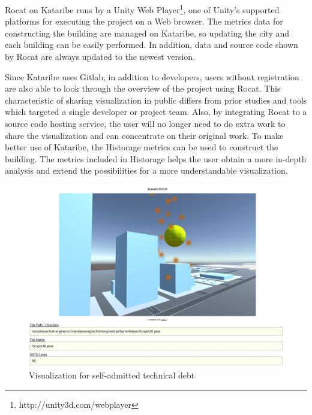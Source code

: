 \documentclass[conference]{IEEEtran}
\begin{document}
\textsf{Rocat} on \textsf{Kataribe} runs by a \textsf{Unity Web Player}\footnote{http://unity3d.com/webplayer}, one of \textsf{Unity}'s supported platforms for executing the project on a Web browser.
The metrics data for constructing the building are managed on \textsf{Kataribe}, so updating the city and each building can be easily performed.
In addition, data and source code shown by \textsf{Rocat} are always updated to the newest version.

Since \textsf{Kataribe} uses \textsf{Gitlab}, in addition to developers, users without registration are also able to look through the overview of the project using \textsf{Rocat}.
This characteristic of sharing visualization in public differs from prior studies and tools which targeted a single developer or project team. 
Also, by integrating \textsf{Rocat} to a source code hosting service, the user will no longer need to do extra work to share the visualization and can concentrate on their original work.
To make better use of \textsf{Kataribe}, the \textsf{Historage} metrics can be used to construct the building.
The metrics included in \textsf{Historage} helps the user obtain a more in-depth analysis and extend the possibilities for a more understandable visualization.


\begin{figure}[tb]
\centering
\includegraphics[width=\linewidth]{satd.pdf}
\caption{Visualization for self-admitted technical debt}
\label{figure:SATD}
\end{figure}
\end{document}
